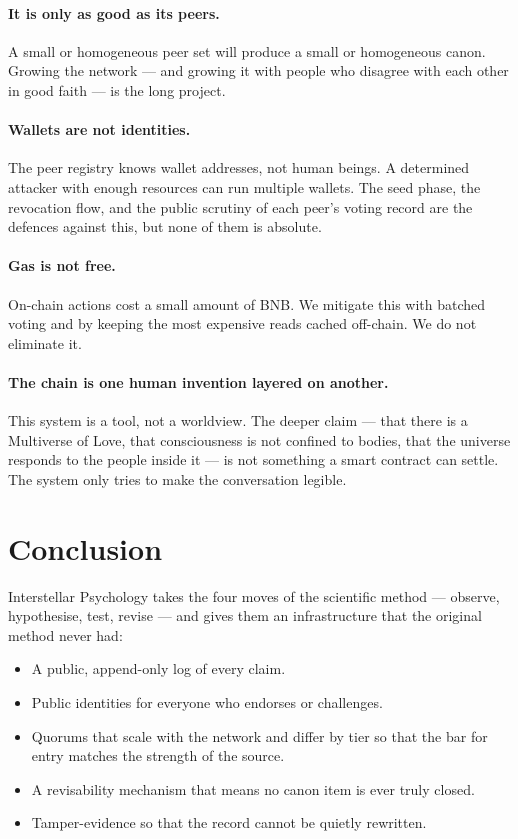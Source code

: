 \documentclass[11pt,a4paper]{article}
\begin{document}
\paragraph{It is only as good as its peers.} A small or homogeneous
peer set will produce a small or homogeneous canon. Growing the
network --- and growing it with people who disagree with each other
in good faith --- is the long project.

\paragraph{Wallets are not identities.} The peer registry knows
wallet addresses, not human beings. A determined attacker with
enough resources can run multiple wallets. The seed phase, the
revocation flow, and the public scrutiny of each peer's voting
record are the defences against this, but none of them is absolute.

\paragraph{Gas is not free.} On-chain actions cost a small amount of
BNB. We mitigate this with batched voting and by keeping the most
expensive reads cached off-chain. We do not eliminate it.

\paragraph{The chain is one human invention layered on another.}
This system is a tool, not a worldview. The deeper claim --- that
there is a Multiverse of Love, that consciousness is not confined
to bodies, that the universe responds to the people inside it ---
is not something a smart contract can settle. The system only tries
to make the conversation legible.

\section{Conclusion}

Interstellar Psychology takes the four moves of the scientific
method --- observe, hypothesise, test, revise --- and gives them an
infrastructure that the original method never had:

\begin{itemize}[leftmargin=1.5em]
  \item A public, append-only log of every claim.
  \item Public identities for everyone who endorses or challenges.
  \item Quorums that scale with the network and differ by tier so
        that the bar for entry matches the strength of the source.
  \item A revisability mechanism that means no canon item is ever
        truly closed.
  \item Tamper-evidence so that the record cannot be quietly
        rewritten.
\end{itemize}
\end{document}
